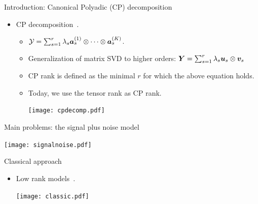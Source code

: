 \documentclass[10pt, mathserif]{beamer} %
\theoremstyle{definition}
\theoremstyle{plain}
\begin{document}
\begin{frame}{Introduction:  Canonical Polyadic (CP) decomposition}
\begin{itemize}
    \item CP decomposition~\citep{hitchcock1927expression}.
    \begin{itemize}
    \item $\mathcal{Y} = \sum_{s = 1}^r\lambda_s\bm{a}_s^{(1)}\otimes \cdots\otimes \bm{a}_s^{(K)}$.
    
    \item Generalization of matrix SVD to higher orders: $\bm Y = \sum_{s = 1}^r \lambda_s \bm u_s\otimes \bm{v}_s$
    \item CP rank is defined as the minimal $r$ for which the above equation holds.
    \item Today, we use the tensor rank as CP rank.
    \begin{center}
    \texttt{[image: cpdecomp.pdf]}
    \end{center}
    \end{itemize}
\end{itemize}
\end{frame}

\begin{frame}{Main problems: the signal plus noise model}
     \begin{center}
    \texttt{[image: signalnoise.pdf]}
    \end{center}
\end{frame}

\begin{frame}{Classical approach}
 \begin{itemize}
 \item Low rank models~\citep{jain2014provable,montanari2018spectral}.\\[.5cm]

    \begin{center}
    \texttt{[image: classic.pdf]}
    \end{center}
 \end{itemize}
\end{frame}
\end{document}
